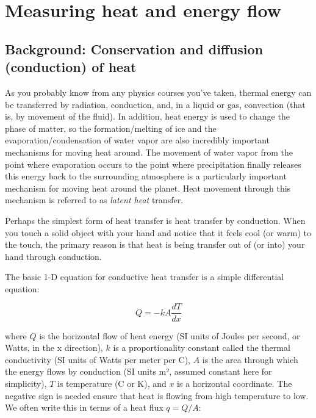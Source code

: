 \setchapterpreamble[u]{\margintoc}
\chapter{Measuring heat and energy flow}

\section{Background: Conservation and diffusion (conduction) of heat}
\label{sec:diffusion}

As you probably know from any physics courses you’ve taken, thermal energy can be transferred by radiation, conduction, and, in a liquid or gas, convection (that is, by movement of the fluid). In addition, heat energy is used to change the phase of matter, so the formation/melting of ice and the evaporation/condensation of water vapor are also incredibly important mechanisms for moving heat around. The movement of water vapor from the point where evaporation occurs to the point where precipitation finally releases this energy back to the surrounding atmosphere is a particularly important mechanism for moving heat around the planet. Heat movement through this mechanism is referred to as \emph{latent heat} transfer.

Perhaps the simplest form of heat transfer is heat transfer by conduction. When you touch a solid object with your hand and notice that it feels cool (or warm) to the touch, the primary reason is that heat is being transfer out of (or into) your hand through conduction.  

The basic 1-D equation for conductive heat transfer is a simple differential equation:

\begin{equation} \label{eq:conduction} 
Q =-kA\frac{dT}{dx}
\end{equation}

where $Q$ is the horizontal flow of heat energy (SI units of Joules per second, or Watts, in the x direction), $k$ is a proportionality constant called the thermal conductivity (SI units of Watts per meter per \textdegree C), $A$ is the area through which the energy flows by conduction (SI units m², assumed constant here for simplicity), $T$ is temperature (\textdegree C or K), and $x$ is a horizontal coordinate.  The negative sign is needed ensure that heat is flowing from high temperature to low.  We often write this in terms of a heat flux $q=Q/A$:

